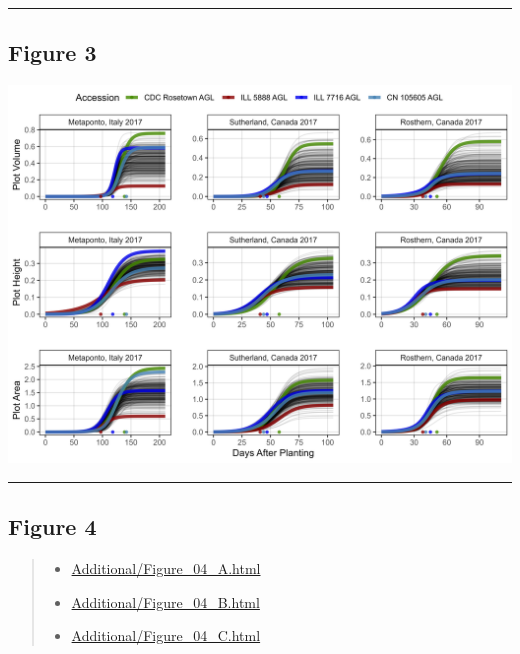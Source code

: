 \documentclass[
]{article}
\providecommand{\tightlist}{%
  \setlength{\itemsep}{0pt}\setlength{\parskip}{0pt}}
\begin{document}
\begin{center}\rule{0.5\linewidth}{0.5pt}\end{center}

\subsection{Figure 3}\label{figure-3}

\includegraphics{Figure_03.png}

\begin{center}\rule{0.5\linewidth}{0.5pt}\end{center}

\pagebreak

\subsection{Figure 4}\label{figure-4}

\begin{quote}
\begin{itemize}
\tightlist
\item
  \href{https://derekmichaelwright.github.io/AGILE_LDP_UAV/Additional/Figure_04_A.html}{Additional/Figure\_04\_A.html}
\item
  \href{https://derekmichaelwright.github.io/AGILE_LDP_UAV/Additional/Figure_04_B.html}{Additional/Figure\_04\_B.html}
\item
  \href{https://derekmichaelwright.github.io/AGILE_LDP_UAV/Additional/Figure_04_C.html}{Additional/Figure\_04\_C.html}
\end{itemize}
\end{quote}
\end{document}
